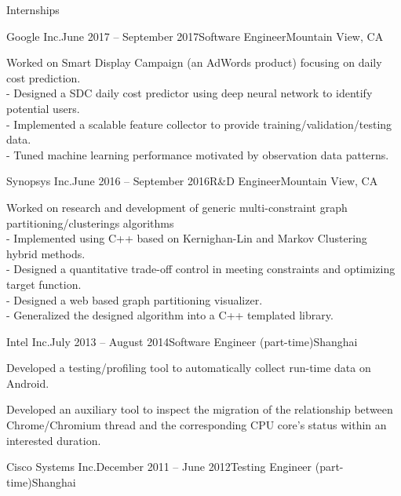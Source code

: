 \documentclass{resume} %
\begin{document}
\begin{rSection}{Internships}

    \begin{rSubsection}{Google Inc.}{June 2017 -- September 2017}{Software Engineer}{Mountain View, CA}

    \item Worked on Smart Display Campaign (an AdWords product) focusing on daily cost prediction.
     \\- Designed a SDC daily cost predictor using deep neural network to identify potential users.
     \\- Implemented a scalable feature collector to provide training/validation/testing data.
     \\- Tuned machine learning performance motivated by observation data patterns.
    \end{rSubsection}

    \begin{rSubsection}{Synopsys Inc.}{June 2016 -- September 2016}{R\&D Engineer}{Mountain View, CA}

    \item Worked on research and development of generic multi-constraint graph partitioning/clusterings algorithms
     \\- Implemented using C++ based on Kernighan-Lin and Markov Clustering hybrid methods.
     \\- Designed a quantitative trade-off control in meeting constraints and optimizing target function.
     \\- Designed a web based graph partitioning visualizer.
     \\- Generalized the designed algorithm into a C++ templated library.
    \end{rSubsection}

    \begin{rSubsection}{Intel Inc.}{July 2013 -- August 2014}{Software Engineer (part-time)}{Shanghai}

    \item Developed a testing/profiling tool to automatically collect run-time data on Android.
    \item Developed an auxiliary tool to inspect the migration of the
        relationship between Chrome/Chromium thread and the corresponding CPU
        core's status within an interested duration.

    \end{rSubsection}

    \begin{rSubsection}{Cisco Systems Inc.}{December 2011 -- June 2012}{Testing Engineer (part-time)}{Shanghai}


\end{rSubsection}
\end{rSection}
\end{document}
